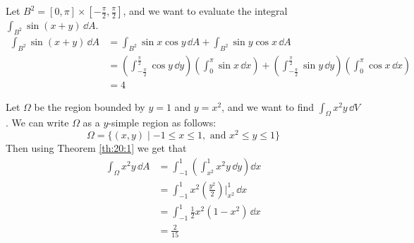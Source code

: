 \documentclass[../Analysis-3.tex]{subfiles}
\begin{document}
\begin{Eg}{}{}
  Let $B^2 = [0,\pi] \times [-\frac{\pi}{2}, \frac{\pi}{2}]$, and we want to evaluate the integral $\displaystyle\int_{B^2} \sin (x+y) \, \dd A$.
  \begin{align*}
    \int_{B^2}\sin(x+y) \, \dd A & = \int_{B^2} \sin x \cos y \, \dd A + \int_{B^2} \sin y \cos x \, \dd A                                                                                                                                                             \\
                                 & = \left( \int_{-\frac{\pi}{2}}^{\frac{\pi}{2}} \cos y \, \dd y\right)\left( \int_{0}^{\pi} \sin x \, \dd x\right) + \left( \int_{-\frac{\pi}{2}}^{\frac{\pi}{2}} \sin y \, \dd y\right)\left( \int_{0}^{\pi} \cos x \, \dd x\right) \\
                                 & = 4
  \end{align*}
\end{Eg}

\begin{Eg}{}{}
  Let $\Omega$ be the region bounded by $y = 1$ and $y = x^2$, and we want to find $\displaystyle\int_{\Omega} x^2y \, \dd V$. We can write $\Omega$ as a $y$-simple region as follows:
  \[
    \Omega = \{ (x,y) \mid -1 \leq x \leq 1, \mbox{ and } x^2 \leq y \leq 1 \}
  \]
  Then using Theorem \ref{th:20:1} we get that
  \begin{align*}
    \int_{\Omega} x^2y \, \dd A
     & = \int_{-1}^1 \left( \int_{x^2}^1 x^2y \, \dd y\right)\dd x               \\
     & = \int_{-1}^1 x^2 \left( \frac{y^2}{2} \right)\bigg\vert_{x^2}^1 \, \dd x \\
     & = \int_{-1}^1 \frac{1}{2} x^2(1-x^2) \, \dd x                             \\
     & = \frac{2}{15}
  \end{align*}
\end{Eg}
\end{document}
